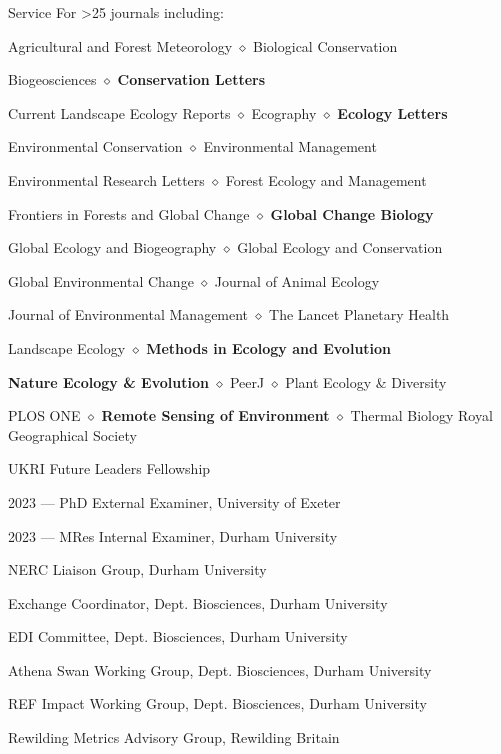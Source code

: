 
\begin{rubric}{Service}
	For >25 journals including:
	\par Agricultural and Forest Meteorology $\diamond$ Biological Conservation
	\par Biogeosciences $\diamond$ \textbf{Conservation Letters}
	\par Current Landscape Ecology Reports $\diamond$ Ecography $\diamond$ \textbf{Ecology Letters}
	\par Environmental Conservation $\diamond$ Environmental Management
	\par Environmental Research Letters $\diamond$ Forest Ecology and Management
	\par Frontiers in Forests and Global Change $\diamond$ \textbf{Global Change Biology}
	\par Global Ecology and Biogeography $\diamond$ Global Ecology and Conservation
	\par Global Environmental Change $\diamond$ Journal of Animal Ecology
	\par Journal of Environmental Management $\diamond$  The Lancet Planetary Health 
	\par Landscape Ecology $\diamond$ \textbf{Methods in Ecology and Evolution} 
	\par \textbf{Nature Ecology \& Evolution} $\diamond$ PeerJ $\diamond$ Plant Ecology \& Diversity 
	\par PLOS ONE $\diamond$ \textbf{Remote Sensing of Environment} $\diamond$ Thermal Biology
	Royal Geographical Society
	\par UKRI Future Leaders Fellowship 
	\par 2023 --- PhD External Examiner, University of Exeter
	\par 2023 --- MRes Internal Examiner, Durham University
	\par NERC Liaison Group, Durham University
	\par Exchange Coordinator, Dept. Biosciences, Durham University
	\par EDI Committee, Dept. Biosciences, Durham University
	\par Athena Swan Working Group, Dept. Biosciences, Durham University
	\par REF Impact Working Group, Dept. Biosciences, Durham University
	\par Rewilding Metrics Advisory Group, Rewilding Britain

\end{rubric}
